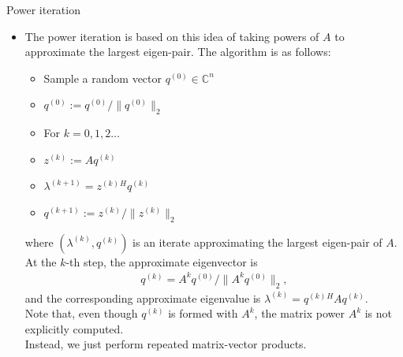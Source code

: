 \documentclass[t,usepdftitle=false]{beamer}
\begin{document}
\begin{frame}{Power iteration}
\begin{itemize}
\item The power iteration is based on this idea of taking powers of $A$ to approximate the largest eigen-pair.
The algorithm is as follows:\vspace{.2cm}
\begin{itemize}
\item[1.] Sample a random vector $q^{(0)}\in\mathbb{C}^n$\vspace{.1cm}
\item[2.]$q^{(0)}:=q^{(0)}/\|q^{(0)}\|_2$\vspace{.1cm}
\item[3.]For $k=0,1,2\dots$\vspace{.1cm}
\item[4.]\hspace{.4cm}$z^{(k)}:=Aq^{(k)}$\vspace{.1cm}
\item[5.]\hspace{.4cm}$\lambda^{(k+1)}=z^{(k)}{}^Hq^{(k)}$\vspace{.1cm}
\item[6.]\hspace{.4cm}$q^{(k+1)}:=z^{(k)}/\|z^{(k)}\|_2$
\end{itemize}\vspace{.2cm}
where $(\lambda^{(k)},q^{(k)})$ is an iterate approximating the largest eigen-pair of $A$.\vspace{.05cm}\\
At the $k$-th step, the approximate eigenvector is 
\begin{align*}
q^{(k)}=A^kq^{(0)}/\|A^kq^{(0)}\|_2,
\end{align*}
and the corresponding approximate eigenvalue is $\lambda^{(k)}=q^{(k)}{}^HAq^{(k)}$.\vspace{.05cm}\\
Note that, even though $q^{(k)}$ is formed with $A^k$, the matrix power $A^k$ is not explicitly computed.\vspace{.05cm}\\
Instead, we just perform repeated matrix-vector products.
\end{itemize}
\end{frame}
\end{document}
